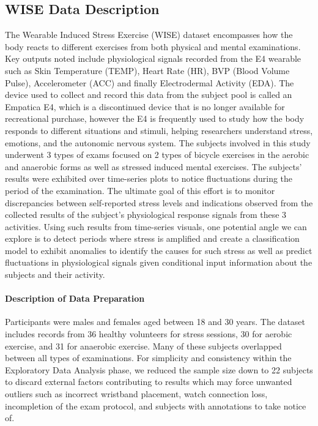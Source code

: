 \documentclass[12pt,letterpaper]{article}
\begin{document}
\subsection{WISE Data Description}
The Wearable Induced Stress Exercise (WISE) dataset encompasses how the body reacts to different exercises from both physical and mental examinations. Key outputs noted include physiological signals recorded from the E4 wearable such as Skin Temperature (TEMP), Heart Rate (HR), BVP (Blood Volume Pulse), Accelerometer (ACC) and finally Electrodermal Activity (EDA). The device used to collect and record this data from the subject pool is called an Empatica E4, which is a discontinued device that is no longer available for recreational purchase, however the E4 is frequently used to study how the body responds to different situations and stimuli, helping researchers understand stress, emotions, and the autonomic nervous system. The subjects involved in this study underwent 3 types of exams focused on 2 types of bicycle exercises in the aerobic and anaerobic forms as well as stressed induced mental exercises. The subjects' results were exhibited over time-series plots to notice fluctuations during the period of the examination. The ultimate goal of this effort is to monitor discrepancies between self-reported stress levels and indications observed from the collected results of the subject’s physiological response signals from these 3 activities. Using such results from time-series visuals, one potential angle we can explore is to detect periods where stress is amplified and create a classification model to exhibit anomalies to identify the causes for such stress as well as predict fluctuations in physiological signals given conditional input information about the subjects and their activity. 


\paragraph{Description of Data Preparation} 

Participants were males and females aged between 18 and 30 years. The dataset includes records from 36 healthy volunteers for stress sessions, 30 for aerobic exercise, and 31 for anaerobic exercise. Many of these subjects overlapped between all types of examinations. For simplicity and consistency within the Exploratory Data Analysis phase, we reduced the sample size down to 22 subjects to discard external factors contributing to results which may force unwanted outliers such as incorrect wristband placement, watch connection loss, incompletion of the exam protocol, and subjects with annotations to take notice of. 
\end{document}
